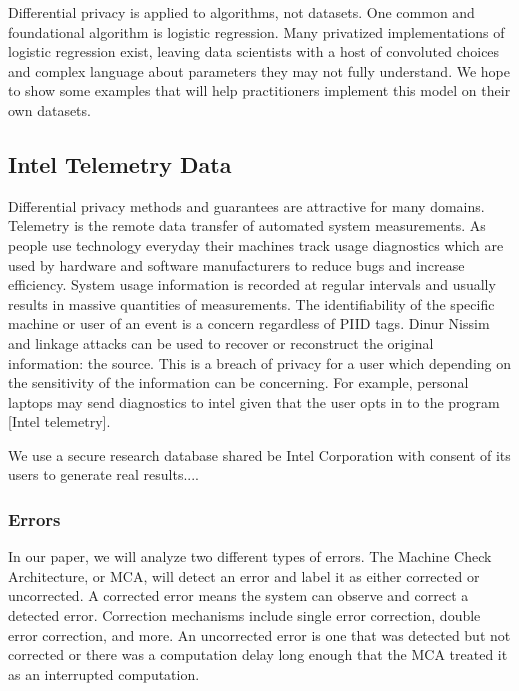 \documentclass[12pt,letterpaper]{article}
\begin{document}
Differential privacy is applied to algorithms, not datasets. One common and foundational algorithm is logistic regression. Many privatized implementations of logistic regression exist, leaving data scientists with a host of convoluted choices and complex language about parameters they may not fully understand. We hope to show some examples that will help practitioners implement this model on their own datasets.

\subsection{Intel Telemetry Data}

Differential privacy methods and guarantees are attractive for many domains. Telemetry is the remote data transfer of automated system measurements. As people use technology everyday their machines track usage diagnostics which are used by hardware and software manufacturers to reduce bugs and increase efficiency. System usage information is recorded at regular intervals and usually results in massive quantities of measurements. The identifiability of the specific machine or user of an event is a concern regardless of PIID tags. Dinur Nissim \cite{dinur} and linkage attacks can be used to recover or reconstruct the original information: the source. This is a breach of privacy for a user which depending on the sensitivity of the information can be concerning. For example, personal laptops may send diagnostics to intel given that the user opts in to the program [Intel telemetry]. 

We use a secure research database shared be Intel Corporation with consent of its users to generate real results....

\subsubsection{Errors}

In our paper, we will analyze two different types of errors. The Machine Check Architecture, or MCA, will detect an error and label it as either corrected or uncorrected. A corrected error means the system can observe and correct a detected error. Correction mechanisms include single error correction, double error correction, and more. An uncorrected error is one that was detected but not corrected or there was a computation delay long enough that the MCA treated it as an interrupted computation. \cite{add a citation}

\end{document}

